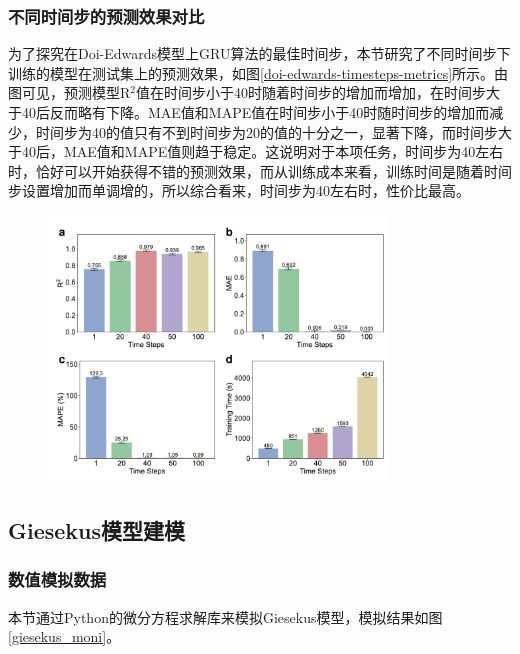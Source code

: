 \subsubsection{不同时间步的预测效果对比}
为了探究在Doi-Edwards模型上GRU算法的最佳时间步，本节研究了不同时间步下训练的模型在测试集上的预测效果，如图\ref{doi-edwards-timesteps-metrics}所示。由图可见，预测模型R$^2$值在时间步小于40时随着时间步的增加而增加，在时间步大于40后反而略有下降。MAE值和MAPE值在时间步小于40时随时间步的增加而减少，时间步为40的值只有不到时间步为20的值的十分之一，显著下降，而时间步大于40后，MAE值和MAPE值则趋于稳定。这说明对于本项任务，时间步为40左右时，恰好可以开始获得不错的预测效果，而从训练成本来看，训练时间是随着时间步设置增加而单调增的，所以综合看来，时间步为40左右时，性价比最高。
\begin{figure}[htbp]
  \centering
  \includegraphics[width=0.8\textwidth]{Fig/doi-edwards-timesteps-metrics.pdf}
  \FigureBicaption{\label{doi-edwards-timesteps-metrics}}{}
\end{figure}
\subsection{Giesekus模型建模}
\subsubsection{数值模拟数据}
本节通过Python的微分方程求解库来模拟Giesekus模型，模拟结果如图\ref{giesekus_moni}。

